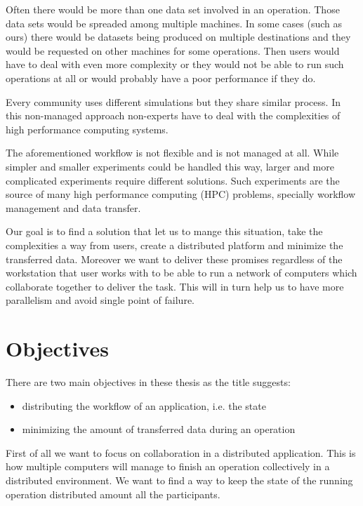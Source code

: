 Often there would be more than one data set involved in an operation. 
Those data sets would be spreaded among multiple machines. 
In some cases (such as ours) there would be datasets being produced on multiple destinations and
they would be requested on other machines for some operations.
Then users would have to deal with even more complexity or they would not be able to run
such operations at all or would probably have a poor performance if they do.

Every community uses different simulations but they share similar process.
In this non-managed approach non-experts have to deal with the complexities of high performance computing systems.

The aforementioned workflow is not flexible and is not managed at all. 
While simpler and smaller experiments could be handled this way,
larger and more complicated experiments require different solutions. 
Such experiments are the source of many high performance computing (HPC) problems,
specially workflow management and data transfer.

Our goal is to find a solution that let us to mange this situation, 
take the complexities a way from users, create a distributed platform and minimize the transferred data.
Moreover we want to deliver these promises regardless of the workstation that user works with to be
able to run a network of computers which collaborate together to deliver the task. 
This will in turn help us to have more parallelism and avoid single point of failure.

\section{Objectives}
There are two main objectives in these thesis as the title suggests:
\begin{itemize}
\item distributing the workflow of an application, i.e. the state
\item minimizing the amount of transferred data during an operation
\end{itemize}

First of all we want to focus on collaboration in a distributed application.
This is how multiple computers will manage to finish an operation collectively in a distributed environment.
We want to find a way to keep the state of the running operation distributed amount all the participants.

